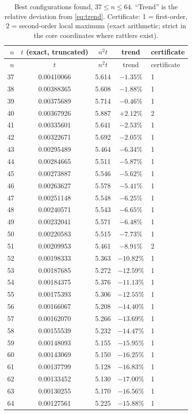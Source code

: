 \documentclass[11pt]{amsart}
\theoremstyle{definition}
\begin{document}
\begingroup\small
\begin{longtable}{@{}rcccl@{}}
\caption{Best configurations found, $37 \le n \le 64$. ``Trend'' is the relative deviation from \eqref{eq:trend}. Certificate: 1 = first-order, 2 = second-order local maximum (exact arithmetic; strict in the core coordinates where rattlers exist).}\label{tab:37-64}\\
\toprule
$n$ & $t$ (exact, truncated) & $n^2t$ & trend & certificate \\
\midrule
\endfirsthead
\toprule
$n$ & $t$ & $n^2t$ & trend & certificate \\
\midrule
\endhead
37 & 0.00410066 & 5.614 & $-1.35\%$ & 1 \\
38 & 0.00388365 & 5.608 & $-1.88\%$ & 1 \\
39 & 0.00375689 & 5.714 & $-0.46\%$ & 1 \\
40 & 0.00367926 & 5.887 & $+2.12\%$ & 2 \\
41 & 0.00335601 & 5.641 & $-2.53\%$ & 1 \\
42 & 0.00322671 & 5.692 & $-2.05\%$ & 1 \\
43 & 0.00295489 & 5.464 & $-6.34\%$ & 1 \\
44 & 0.00284665 & 5.511 & $-5.87\%$ & 1 \\
45 & 0.00273887 & 5.546 & $-5.62\%$ & 1 \\
46 & 0.00263627 & 5.578 & $-5.41\%$ & 1 \\
47 & 0.00251148 & 5.548 & $-6.25\%$ & 1 \\
48 & 0.00240571 & 5.543 & $-6.65\%$ & 1 \\
49 & 0.00232041 & 5.571 & $-6.48\%$ & 1 \\
50 & 0.00220583 & 5.515 & $-7.73\%$ & 1 \\
51 & 0.00209953 & 5.461 & $-8.91\%$ & 2 \\
52 & 0.00198333 & 5.363 & $-10.82\%$ & 1 \\
53 & 0.00187685 & 5.272 & $-12.59\%$ & 1 \\
54 & 0.00184375 & 5.376 & $-11.13\%$ & 1 \\
55 & 0.00175393 & 5.306 & $-12.55\%$ & 1 \\
56 & 0.00166067 & 5.208 & $-14.40\%$ & 1 \\
57 & 0.00162070 & 5.266 & $-13.69\%$ & 1 \\
58 & 0.00155539 & 5.232 & $-14.47\%$ & 1 \\
59 & 0.00148093 & 5.155 & $-15.95\%$ & 1 \\
60 & 0.00143069 & 5.150 & $-16.25\%$ & 1 \\
61 & 0.00137799 & 5.128 & $-16.83\%$ & 1 \\
62 & 0.00133452 & 5.130 & $-17.00\%$ & 1 \\
63 & 0.00130255 & 5.170 & $-16.56\%$ & 1 \\
64 & 0.00127561 & 5.225 & $-15.88\%$ & 1 \\
\bottomrule
\end{longtable}
\endgroup
\end{document}
